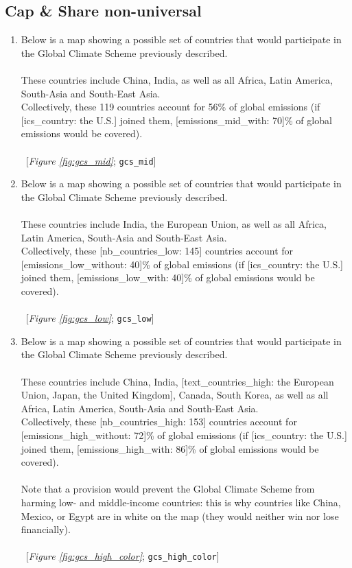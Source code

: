  \subsection*{Cap \& Share non-universal } 
 \begin{enumerate}[resume] 
\item  \label{q:gcs_mid} Below is a map showing a possible set of countries that would participate in the Global Climate Scheme previously described.\\
~\\
These countries include China, India, as well as all Africa, Latin America, South-Asia and South-East Asia.\\
Collectively, these 119 countries account for 56\% of global emissions (if [ics\_country: the U.S.] joined them, [emissions\_mid\_with: 70]\% of global emissions would be covered).\\
~\\ 
~[\textit{Figure \ref{fig:gcs_mid}}; 
\verb|gcs_mid|]


\item  \label{q:gcs_low} Below is a map showing a possible set of countries that would participate in the Global Climate Scheme previously described.\\
~\\
These countries include India, the European Union, as well as all Africa, Latin America, South-Asia and South-East Asia.\\
Collectively, these [nb\_countries\_low: 145] countries account for [emissions\_low\_without: 40]\% of global emissions (if [ics\_country: the U.S.] joined them, [emissions\_low\_with: 40]\% of global emissions would be covered).\\
~\\ 
~[\textit{Figure \ref{fig:gcs_low}}; 
\verb|gcs_low|]


\item  \label{q:gcs_high_color} Below is a map showing a possible set of countries that would participate in the Global Climate Scheme previously described.\\
~\\
These countries include China, India, [text\_countries\_high: the European Union, Japan, the United Kingdom], Canada, South Korea, as well as all Africa, Latin America, South-Asia and South-East Asia. \\
Collectively, these [nb\_countries\_high: 153] countries account for [emissions\_high\_without: 72]\% of global emissions (if [ics\_country: the U.S.] joined them, [emissions\_high\_with: 86]\% of global emissions would be covered).\\\\Note that a provision would prevent the Global Climate Scheme from harming low- and middle-income countries: this is why countries like China, Mexico, or Egypt are in white on the map (they would neither win nor lose financially).\\
~\\ 
~[\textit{Figure \ref{fig:gcs_high_color}}; 
\verb|gcs_high_color|]



\end{enumerate}
